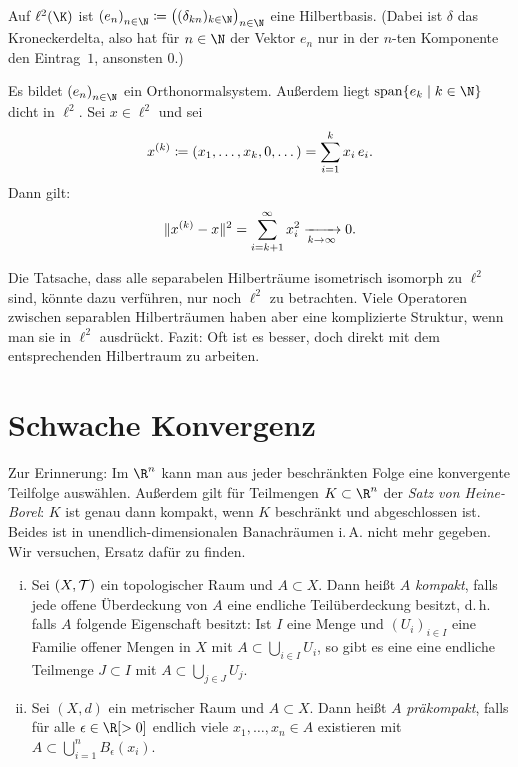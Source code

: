 \nnBemerkung
Auf $\ell^2(\K)$ ist 
$\nSeq e \defeq \bigl((\kron{kn})_{k\in\N}\bigr)_{n\in\N}$
eine Hilbertbasis. (Dabei ist $\delta$ das Kroneckerdelta, also
hat für $n\in\N$ der Vektor $e_n$ nur in der $n$-ten Komponente
den Eintrag~$1$, ansonsten $0$.)

Es bildet $\nSeq e$ ein Orthonormalsystem. Außerdem liegt 
$\spann\{ e_k \Mid k\in\N\}$ dicht in $\ell^2$. Sei $x\in\ell^2$ und
sei
\[ x^{(k)} \defeq (x_1,\dots,x_k,0,\dots) = \isum^k x_i\,e_i  . \]
Dann gilt: 
\[ \norm{x^{(k)} - x}^2 = \isum[k+1]^\infty x_i^2 \Xtoinfty{k} 0
. \]

\nnBemerkung
Die Tatsache, dass alle separabelen Hilberträume isometrisch isomorph zu
$\ell^2$ sind, könnte dazu verführen, nur noch $\ell^2$ zu betrachten. Viele
Operatoren zwischen separablen Hilberträumen haben aber eine komplizierte
Struktur, wenn man sie in $\ell^2$ ausdrückt. Fazit: Oft ist es besser,
doch direkt mit dem entsprechenden Hilbertraum zu arbeiten.


\chapter{Schwache Konvergenz}
Zur Erinnerung: Im $\R^n$ kann man aus jeder beschränkten Folge eine konvergente
Teilfolge auswählen. Außerdem gilt für Teilmengen $K\subset\R^n$ der
\emph{Satz von Heine-Borel}: $K$ ist genau dann kompakt, wenn $K$ beschränkt und
abgeschlossen ist. Beides ist in unendlich-dimensionalen Banachräumen i.\,A.
nicht mehr gegeben. Wir versuchen, Ersatz dafür zu finden.

\begin{thDef}
    \begin{enumerate}[(i)]
        \item
            Sei $(X,\Topo)$ ein topologischer Raum und $A\subset X$.
            Dann heißt $A$ \emph{kompakt}, falls jede offene Überdeckung von
            $A$ eine endliche Teilüberdeckung besitzt, d.\,h. falls $A$ folgende
            Eigenschaft besitzt:
            Ist $I$ eine Menge und $(U_i)_{i\in I}$ eine Familie offener Mengen
            in $X$ mit $A\subset \bigcup_{i\in I} U_i$, so gibt es eine eine
            endliche Teilmenge $J\subset I$ mit $A\subset \bigcup_{j\in J} U_j$.
            
        \item
            Sei $(X,d)$ ein metrischer Raum und $A\subset X$. Dann heißt $A$
            \emph{präkompakt}, falls für alle $\epsilon\in\R[>0]$ endlich viele
            $x_1,\dots,x_n\in A$ existieren mit $A\subset\bigcup_{i=1}^n
            B_\epsilon(x_i)$.
    \end{enumerate}
\end{thDef}

